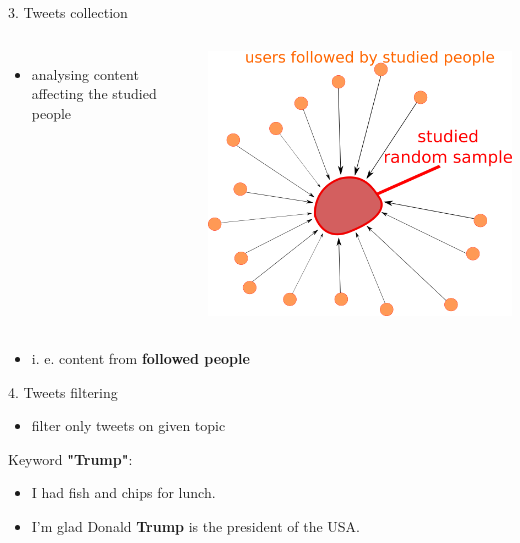 \documentclass{beamer}
\newcommand{\cmark}{\ding{51}} %
\newcommand{\xmark}{\ding{55}} %
\begin{document}
\begin{frame}[fragile]
\begin{columns}[T]
\begin{column}{.33\textwidth}
\begin{blankblock}{3. Tweets collection}
\begin{columns}
\begin{itemize}
            \item analysing content affecting the studied people
    	\end{itemize}
    	\center
    	\includegraphics[scale=0.65]{./Pics/followers.png}
    \end{columns}
    \vspace{0.8cm}
    \begin{itemize}
        \item i. e. content from \textbf{followed people}
    \end{itemize}
\end{blankblock}
\begin{blankblock}{4. Tweets filtering}
\begin{itemize}
    \item filter only tweets on given topic
\end{itemize}
\vspace{0.3cm}
Keyword \textbf{"Trump"}:
\vspace{0.7cm}
\begin{itemize}\centering
    \item[\textcolor{black}{\xmark}] I had fish and chips for lunch.
    \item[\textcolor{black}{\cmark}] I'm glad Donald \textbf{Trump} is the president of the USA.

\end{itemize}
\end{blankblock}
\end{column}
\end{columns}
\end{frame}
\end{document}

